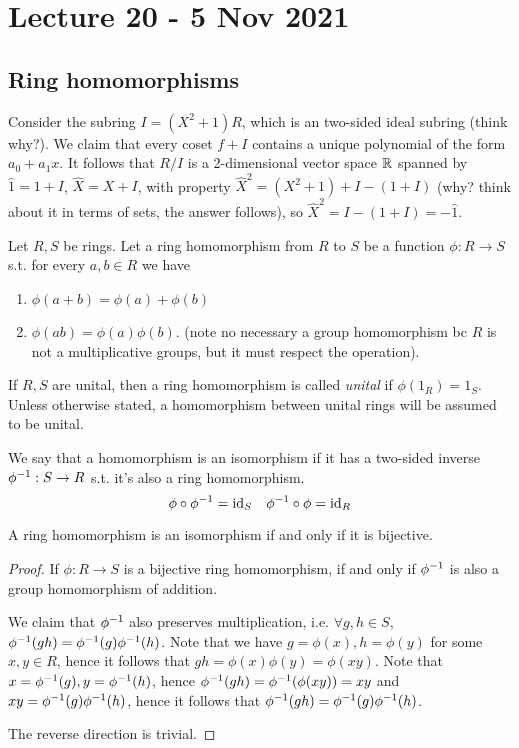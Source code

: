 \section{Lecture 20 - 5 Nov 2021}
\subsection{Ring homomorphisms}
\begin{example}
  Consider the subring $I=(X^2+1)R$, which is an two-sided ideal subring (think why?). We
  claim that every coset $f+I$ contains a unique polynomial of the form $a_0+a_1x$. It
  follows that $R/I$ is a 2-dimensional vector space $\mathbb R$ spanned by $\hat{1}=1+I$,
  $\hat{X}=X+I$, with property $\hat{X}^2=(X^2+1)+I - (1+I)$ (why? think about it in terms
  of sets, the answer follows), so $\hat{X}^2=I-(1+I)= -\hat{1}$.
\end{example}

\begin{definition}
  Let $R,S$ be rings. Let a ring homomorphism from $R$ to $S$ be a function $\phi:R\to S$
  s.t. for every $a,b\in R$ we have 
  \begin{enumerate}
    \item $\phi(a+b)=\phi(a)+\phi(b)$
    \item $\phi(ab)=\phi(a)\phi(b)$. (note no necessary a group homomorphism bc $R$ is not
      a multiplicative groups, but it must respect the operation).
  \end{enumerate}
  If $R,S$ are unital, then a ring homomorphism is called \emph{unital} if
  $\phi(1_R)=1_S$. Unless otherwise stated, a homomorphism between unital rings will be
  assumed to be unital.

  We say that a homomorphism is an isomorphism if it has a two-sided inverse
  $\phi^{-1}:S\to R$ s.t. it's also a ring homomorphism. 
  \[\phi \circ \phi^{-1} = \mathrm{id}_S \quad \phi^{-1}\circ\phi = \mathrm{id}_R\]
  \label{def:ringHomUnital}
\end{definition}

\begin{theorem}
  A ring homomorphism is an isomorphism if and only if it is bijective.
  \label{<+label+>}
\end{theorem}
\begin{proof}
  If $\phi:R\to S$ is a bijective ring homomorphism, if and only if $\phi^{-1}$ is also a group
  homomorphism of addition. 

  We claim that $\phi^{-1}$ also preserves multiplication, i.e.
  $\forall g,h\in S$, $\phi^{-1}(gh)=\phi^{-1}(g)\phi^{-1}(h)$. Note that we have
  $g=\phi(x),h=\phi(y)$ for some $x,y\in R$, hence it follows that
  $gh=\phi(x)\phi(y)=\phi(xy)$. Note that $x=\phi^{-1}(g),y=\phi^{-1}(h)$, hence
  $\phi^{-1}(gh)=\phi^{-1}(\phi(xy))=xy$ and $xy=\phi^{-1}(g)\phi^{-1}(h)$, hence it follows
  that $\phi^{-1}(gh)=\phi^{-1}(g)\phi^{-1}(h)$.

  The reverse direction is trivial.
\end{proof}


